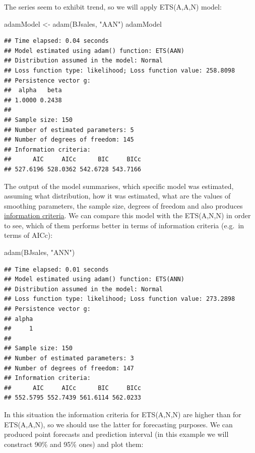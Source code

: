 \documentclass[
]{book}
\newenvironment{Shaded}{\begin{snugshade}}{\end{snugshade}}
\newcommand{\FunctionTok}[1]{\textcolor[rgb]{0.00,0.00,0.00}{#1}}
\newcommand{\NormalTok}[1]{#1}
\newcommand{\OtherTok}[1]{\textcolor[rgb]{0.56,0.35,0.01}{#1}}
\newcommand{\StringTok}[1]{\textcolor[rgb]{0.31,0.60,0.02}{#1}}
\theoremstyle{definition}
\theoremstyle{definition}
\theoremstyle{definition}
\theoremstyle{definition}
\theoremstyle{remark}
\begin{document}
The series seem to exhibit trend, so we will apply ETS(A,A,N) model:

\begin{Shaded}
\begin{Highlighting}[]
\NormalTok{adamModel }\OtherTok{\textless{}{-}} \FunctionTok{adam}\NormalTok{(BJsales, }\StringTok{"AAN"}\NormalTok{)}
\NormalTok{adamModel}
\end{Highlighting}
\end{Shaded}

\begin{verbatim}
## Time elapsed: 0.04 seconds
## Model estimated using adam() function: ETS(AAN)
## Distribution assumed in the model: Normal
## Loss function type: likelihood; Loss function value: 258.8098
## Persistence vector g:
##  alpha   beta 
## 1.0000 0.2438 
## 
## Sample size: 150
## Number of estimated parameters: 5
## Number of degrees of freedom: 145
## Information criteria:
##      AIC     AICc      BIC     BICc 
## 527.6196 528.0362 542.6728 543.7166
\end{verbatim}

The output of the model summarises, which specific model was estimated, assuming what distribution, how it was estimated, what are the values of smoothing parameters, the sample size, degrees of freedom and also produces \protect\hyperlink{modelSelection}{information criteria}. We can compare this model with the ETS(A,N,N) in order to see, which of them performs better in terms of information criteria (e.g.~in terms of AICc):

\begin{Shaded}
\begin{Highlighting}[]
\FunctionTok{adam}\NormalTok{(BJsales, }\StringTok{"ANN"}\NormalTok{)}
\end{Highlighting}
\end{Shaded}

\begin{verbatim}
## Time elapsed: 0.01 seconds
## Model estimated using adam() function: ETS(ANN)
## Distribution assumed in the model: Normal
## Loss function type: likelihood; Loss function value: 273.2898
## Persistence vector g:
## alpha 
##     1 
## 
## Sample size: 150
## Number of estimated parameters: 3
## Number of degrees of freedom: 147
## Information criteria:
##      AIC     AICc      BIC     BICc 
## 552.5795 552.7439 561.6114 562.0233
\end{verbatim}

In this situation the information criteria for ETS(A,N,N) are higher than for ETS(A,A,N), so we should use the latter for forecasting purposes. We can produced point forecasts and prediction interval (in this example we will constract 90\% and 95\% ones) and plot them:
\end{document}
